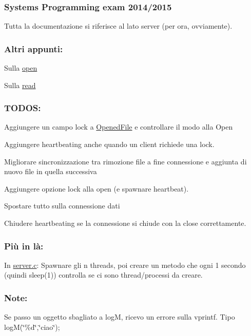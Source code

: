\subsubsection*{Systems Programming exam 2014/2015}

Tutta la documentazione si riferisce al lato server (per ora, ovviamente). \subsubsection*{Altri appunti\+:}


\begin{DoxyItemize}
\item Sulla \hyperlink{md_OPE}{open}
\item Sulla \hyperlink{md_READ}{read}
\end{DoxyItemize}

\subsubsection*{T\+O\+D\+O\+S\+:}


\begin{DoxyItemize}
\item Aggiungere un campo lock a \hyperlink{structOpenedFile}{Opened\+File} e controllare il modo alla Open
\item Aggiungere heartbeating anche quando un client richiede una lock.
\item Migliorare sincronizzazione tra rimozione file a fine connessione e aggiunta di nuovo file in quella successiva
\item Aggiungere opzione lock alla open (e spawnare heartbeat).
\item Spostare tutto sulla connessione dati
\item Chiudere heartbeating se la connessione si chiude con la close correttamente. \subsubsection*{Più in là\+:}
\end{DoxyItemize}


\begin{DoxyItemize}
\item In \hyperlink{server_8c}{server.\+c}\+: Spawnare gli n threads, poi creare un metodo che ogni 1 secondo (quindi sleep(1)) controlla se ci sono thread/processi da creare.
\end{DoxyItemize}

\subsubsection*{Note\+:}


\begin{DoxyItemize}
\item Se passo un oggetto sbagliato a log\+M, ricevo un errore sulla vprintf. Tipo log\+M(\char`\"{}\%d\char`\"{},\char`\"{}ciao\char`\"{}); 
\end{DoxyItemize}